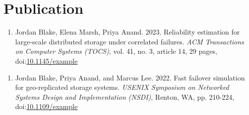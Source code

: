 \section*{Publication}


\begin{enumerate}[resume]
    \item Jordan Blake, Elena Marsh, Priya Anand. 2023. Reliability estimation
    for large-scale distributed storage under correlated failures.
    \textit{ACM Transactions on Computer Systems (TOCS)}, vol. 41, no. 3,
    article 14, 29 pages, doi:\href{https://doi.org/10.1145/example}{10.1145/example}
\end{enumerate}


\begin{enumerate}[resume]
    \item Jordan Blake, Priya Anand, and Marcus Lee. 2022. Fast failover
    simulation for geo-replicated storage systems. \textit{USENIX Symposium
    on Networked Systems Design and Implementation (NSDI)}, Renton, WA,
    pp. 210-224, doi:\href{https://doi.org/10.1109/example}{10.1109/example}
    \newline {}
\end{enumerate}
